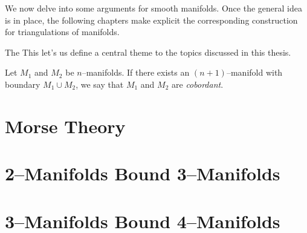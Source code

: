 \label{cha:cobordisms}

We now delve into some arguments for smooth manifolds.
Once the general idea is in place, the following chapters make explicit the corresponding construction for triangulations of manifolds.

The This let's us define a central theme to the topics discussed in this thesis.

\begin{defn}
  Let $M_1$ and $M_2$ be $n$--manifolds.
  If there exists an $(n+1)$--manifold with boundary $M_1\cup M_2$, we say that $M_1$ and $M_2$ are \emph{cobordant}.
\end{defn}

\section{Morse Theory}


\section{2--Manifolds Bound 3--Manifolds}


\section{3--Manifolds Bound 4--Manifolds}


%

